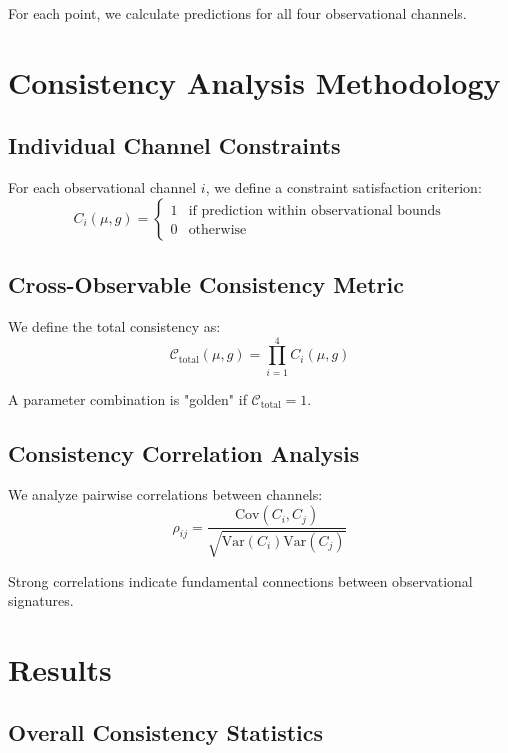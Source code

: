 \documentclass[12pt]{article}
\begin{document}
For each point, we calculate predictions for all four observational channels.

\section{Consistency Analysis Methodology}

\subsection{Individual Channel Constraints}

For each observational channel $i$, we define a constraint satisfaction criterion:
\begin{equation}
C_i(\mu, g) = \begin{cases}
1 & \text{if prediction within observational bounds} \\
0 & \text{otherwise}
\end{cases}
\end{equation}

\subsection{Cross-Observable Consistency Metric}

We define the total consistency as:
\begin{equation}
\mathcal{C}_{\text{total}}(\mu, g) = \prod_{i=1}^4 C_i(\mu, g)
\end{equation}

A parameter combination is "golden" if $\mathcal{C}_{\text{total}} = 1$.

\subsection{Consistency Correlation Analysis}

We analyze pairwise correlations between channels:
\begin{equation}
\rho_{ij} = \frac{\text{Cov}(C_i, C_j)}{\sqrt{\text{Var}(C_i)\text{Var}(C_j)}}
\end{equation}

Strong correlations indicate fundamental connections between observational signatures.

\section{Results}

\subsection{Overall Consistency Statistics}
\end{document}
